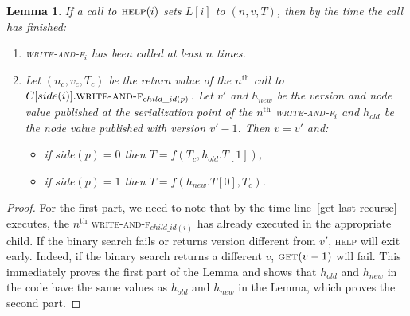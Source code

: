 \documentclass{thesis}
\newtheorem{lemma}{Lemma}
\newcommand{\fn}[1]{\textsc{#1}}
\begin{document}
\begin{lemma}
	If a call to $\fn{help}(i)$ sets $L[i]$ to $(n, v, T)$, then by the time the call has finished: \label{last-is-correct}
\begin{enumerate}
	\item \fn{write-and-f$_i$} has been called at least $n$ times.
	\item Let $(n_c, v_c, T_c)$ be the return value of the $n^{\text{th}}$ call to $C[side(i)].\fn{write-and-f}_{child\_id(p)}$. Let $v'$ and $h_{new}$ be the version and node value published at the serialization point of the $n^{\text{th}}$
		\fn{write-and-f$_i$} and $h_{old}$ be the node value published with version $v'-1$. Then $v = v'$ and:
		\begin{itemize}
			\item if $side(p) = 0$ then $T = f(T_c, h_{old}.T[1])$,
			\item if $side(p) = 1$ then $T = f(h_{new}.T[0], T_c)$.
		\end{itemize}
\end{enumerate}
\end{lemma}
\begin{proof}
	For the first part, we need to note that by the time line~\ref{get-last-recurse} executes, the $n^{\text{th}}$ \fn{write-and-f$_{child\_id(i)}$} has already executed in the appropriate child.
	If the binary search fails or returns version different from $v'$, \fn{help} will exit early. Indeed, if the binary search returns a different $v$, $\fn{get}(v-1)$ will fail.
	This immediately proves the first part of the Lemma and shows that $h_{old}$ and $h_{new}$ in the code have the same values as $h_{old}$ and $h_{new}$ in the Lemma, which proves the second part.
\end{proof}
\end{document}
